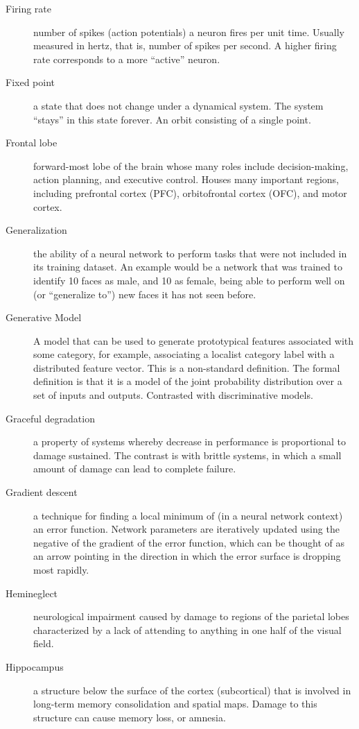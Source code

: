 \begin{description}
\item[Firing rate] number of spikes (action potentials) a neuron fires per unit time. Usually measured in hertz, that is, number of spikes per second. A higher firing rate corresponds to a more ``active'' neuron. 
\item[Fixed point] a state that does not change under a dynamical system. The system ``stays'' in this state forever. An orbit consisting of a single point.
\item[Frontal lobe] forward-most lobe of the brain whose many roles include decision-making, action planning, and executive control. Houses many important regions, including prefrontal cortex (PFC), orbitofrontal cortex (OFC), and motor cortex. 
\item[Generalization] the ability of a neural network to perform tasks that were not included in its training dataset. An example would be a network that was trained to identify 10 faces as male, and 10 as female, being able to perform well on (or ``generalize to'') new faces it has not seen before.
\item[Generative Model] A model that can be used to generate prototypical features associated with some category, for example, associating a localist category label with a distributed feature vector. This is a non-standard definition. The formal definition is that it is a model of the joint probability distribution over a set of inputs and outputs. Contrasted with discriminative models. 
\item[Graceful degradation] a property of systems whereby decrease in performance is proportional to damage sustained. The contrast is with brittle systems, in which a small amount of damage can lead to complete failure.
\item[Gradient descent] a technique for finding a local minimum of (in a neural network context) an error function. Network parameters are iteratively updated using the negative of the gradient of the error function, which can be thought of as an arrow pointing in the direction in which the error surface is dropping most rapidly.
\item[Hemineglect] neurological impairment caused by damage to regions of the parietal lobes characterized by a lack of attending to anything in one half of the visual field.
\item[Hippocampus] a structure below the surface of the cortex (subcortical) that is involved in long-term memory consolidation and spatial maps. Damage to this structure can cause memory loss, or amnesia. 

\end{description}
